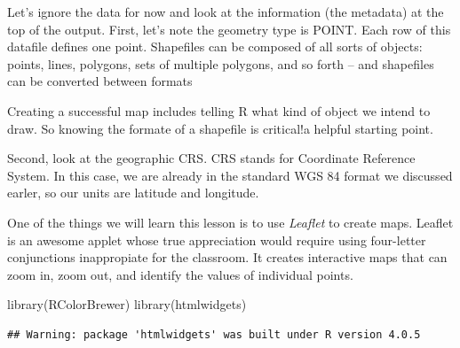\documentclass[
]{book}
\newenvironment{Shaded}{\begin{snugshade}}{\end{snugshade}}
\newcommand{\AttributeTok}[1]{\textcolor[rgb]{0.77,0.63,0.00}{#1}}
\newcommand{\DecValTok}[1]{\textcolor[rgb]{0.00,0.00,0.81}{#1}}
\newcommand{\FunctionTok}[1]{\textcolor[rgb]{0.00,0.00,0.00}{#1}}
\newcommand{\NormalTok}[1]{#1}
\newcommand{\OtherTok}[1]{\textcolor[rgb]{0.56,0.35,0.01}{#1}}
\newcommand{\SpecialCharTok}[1]{\textcolor[rgb]{0.00,0.00,0.00}{#1}}
\newcommand{\StringTok}[1]{\textcolor[rgb]{0.31,0.60,0.02}{#1}}
\begin{document}
Let's ignore the data for now and look at the information (the metadata) at the top of the output. First, let's note the geometry type is POINT. Each row of this datafile defines one point. Shapefiles can be composed of all sorts of objects: points, lines, polygons, sets of multiple polygons, and so forth -- and shapefiles can be converted between formats

Creating a successful map includes telling R what kind of object we intend to draw. So knowing the formate of a shapefile is critical!a helpful starting point.

Second, look at the geographic CRS. CRS stands for Coordinate Reference System. In this case, we are already in the standard WGS 84 format we discussed earler, so our units are latitude and longitude.

One of the things we will learn this lesson is to use \emph{Leaflet} to create maps. Leaflet is an awesome applet whose true appreciation would require using four-letter conjunctions inappropiate for the classroom. It creates interactive maps that can zoom in, zoom out, and identify the values of individual points.

\begin{Shaded}
\begin{Highlighting}[]
\FunctionTok{library}\NormalTok{(RColorBrewer)}
\FunctionTok{library}\NormalTok{(htmlwidgets)}
\end{Highlighting}
\end{Shaded}

\begin{verbatim}
## Warning: package 'htmlwidgets' was built under R version 4.0.5
\end{verbatim}

\begin{Shaded}
\end{Shaded}
\end{document}
